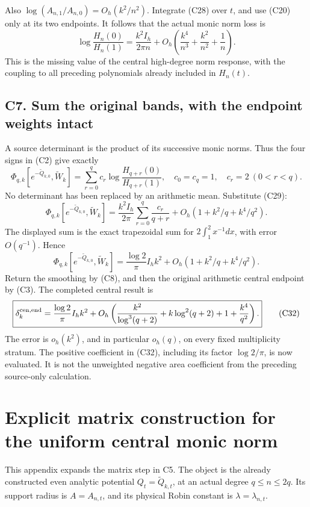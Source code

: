 Also \(\log(A_{n,1}/A_{n,0})=O_h(k^2/n^2)\). Integrate (C28) over \(t\),
and use (C20) only at its two endpoints. It follows that the actual
monic norm loss is \[
\boxed{\log\frac{H_n(0)}{H_n(1)}
=\frac{k^2I_h}{2\pi n}
+O_h\left(\frac{k^4}{n^3}+\frac{k^2}{n^2}+\frac1n\right).}\tag{C29}
\] This is the missing value of the central high-degree norm response,
with the coupling to all preceding polynomials already included in
\(H_n(t)\).

\subsection{C7. Sum the original bands, with the endpoint weights
intact}\label{sa:c7.-sum-the-original-bands-with-the-endpoint-weights-intact}

A source determinant is the product of its successive monic norms. Thus
the four signs in (C2) give exactly \[
\Phi_{q,k}[e^{-\widetilde Q_{k,0}},\widetilde W_k]
=\sum_{r=0}^q c_r\log\frac{H_{q+r}(0)}{H_{q+r}(1)},
\quad c_0=c_q=1,\quad c_r=2\ (0<r<q).
\tag{C30}
\] No determinant has been replaced by an arithmetic mean. Substitute
(C29): \[
\Phi_{q,k}[e^{-\widetilde Q_{k,0}},\widetilde W_k]
=\frac{k^2I_h}{2\pi}\sum_{r=0}^q\frac{c_r}{q+r}
+O_h(1+k^2/q+k^4/q^2).
\] The displayed sum is the exact trapezoidal sum for
\(2\int_1^2x^{-1}dx\), with error \(O(q^{-1})\). Hence \[
\Phi_{q,k}[e^{-\widetilde Q_{k,0}},\widetilde W_k]
=\frac{\log2}{\pi}I_h k^2+O_h(1+k^2/q+k^4/q^2).
\tag{C31}
\] Return the smoothing by (C8), and then the original arithmetic
central endpoint by (C3). The completed central result is \[
\boxed{\delta_k^{\rm cen,end}
=\frac{\log2}{\pi}I_h k^2+
O_h\left(\frac{k^2}{\log^3(q+2)}+k\log^2(q+2)+1+\frac{k^4}{q^2}\right).}\tag{C32}
\] The error is \(o_h(k^2)\), and in particular \(o_h(q)\), on every
fixed multiplicity stratum. The positive coefficient in (C32), including
its factor \(\log2/\pi\), is now evaluated. It is not the unweighted
negative area coefficient from the preceding source-only calculation.

\newpage

\section{Explicit matrix construction for the uniform central monic
norm}\label{sa:explicit-matrix-construction-for-the-uniform-central-monic-norm}

This appendix expands the matrix step in C5. The object is the already
constructed even analytic potential \(Q_t=\widetilde Q_{k,t}\), at an
actual degree \(q\le n\le2q\). Its support radius is \(A=A_{n,t}\), and
its physical Robin constant is \(\lambda=\lambda_{n,t}\).

